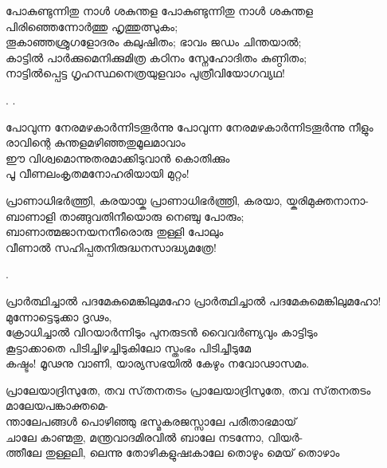 \begin{enumerate}

\begin{slokam}{\VSv}{\ARRV}{പോകുണ്ടുന്നിതു നാൾ ശകുന്തള}
പോകുണ്ടുന്നിതു നാൾ ശകുന്തള പിരിഞ്ഞെന്നോർത്തു ഹൃത്തുത്സുകം;\\
തൂകാഞ്ഞശ്രുഗളോദരം കലുഷിതം; ഭാവം ജഡം ചിന്തയാൽ;\\
കാട്ടിൽ പാർക്കുമെനിക്കുമിത്ര കഠിനം സ്നേഹോദിതം കുണ്ഠിതം;\\
നാട്ടിൽപ്പെട്ട ഗൃഹസ്ഥനെത്രയുളവാം പുത്രീവിയോഗവ്യഥ!
\end{slokam}


.
.

\begin{slokam}{\VVt}{\HM}{പോവുന്ന നേരമഴകാർന്നിടതൂർന്നു}
പോവുന്ന നേരമഴകാർന്നിടതൂർന്നു നീളും\\
രാവിന്റെ കുന്തളമഴിഞ്ഞതുമൂലമാവാം\\
ഈ വിശ്വമൊന്നുതരമാക്കിടുവാൻ കൊതിക്കും\\
പൂ വീണലംകൃതമനോഹരിയായി മുറ്റം!
\end{slokam}





\begin{slokam}{\VVt}{\VNM}{പ്രാണാധിഭർത്ത്രി, കരയായ്ക}
 പ്രാണാധിഭർത്ത്രി, കരയാ, യ്കരിമുക്തനാനാ-\\
ബാണാളി താങ്ങുവതിനീയൊരു നെഞ്ചു പോരും;\\
ബാണാത്മജാനയനനീരൊരു തുള്ളി പോലും\\
വീണാൽ സഹിപ്പതനിരുദ്ധനസാദ്ധ്യമത്രേ!
\end{slokam}


.



\begin{slokam}{\VSv}{\ARRV}{പ്രാര്‍ത്ഥിച്ചാല്‍ പദമേകുമെങ്കിലുമഹോ}
 പ്രാര്‍ത്ഥിച്ചാല്‍ പദമേകുമെങ്കിലുമഹോ! മുന്നോട്ടെടുക്കാ ദൃഢം,\\
ക്രോധിച്ചാല്‍ വിറയാര്‍ന്നിടും പുനരുടന്‍ വൈവര്‍ണ്യവും കാട്ടിടും\\
കൂട്ടാക്കാതെ പിടിച്ചിഴച്ചിടുകിലോ സ്തംഭം പിടിച്ചീടുമേ\\
കഷ്ടം! മൂഢനു വാണി, യാര്യസഭയില്‍ കേഴും നവോഢാസമം.
\end{slokam}



\begin{slokam}{\VSv}{\MPN}{പ്രാലേയാദ്രിസുതേ, തവ സ്‌തനതടം}
പ്രാലേയാദ്രിസുതേ, തവ സ്‌തനതടം മാലേയപങ്കാക്തമെ-\\
ന്താലേപങ്ങൾ പൊഴിഞ്ഞു ഭസ്മകരജസ്സാലേ പരീതാഭമായ്\\
ചാലേ കാണ്മതു, മന്ത്രവാദമിരവിൽ ബാലേ നടന്നോ, വിയർ-\\
ത്തീലേ തുള്ളലി, ലെന്നു തോഴികളുഷഃകാലേ തൊഴും മെയ് തൊഴാം
\end{slokam}



\end{enumerate}
